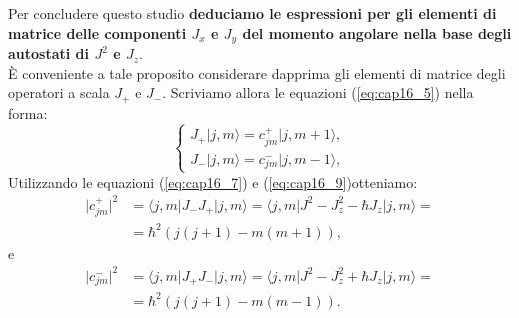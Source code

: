 Per concludere questo studio \textbf{deduciamo le espressioni per gli elementi di matrice delle componenti $J_x$ e $J_y$ del momento angolare nella base degli autostati di $J^2$ e $J_z$}.\\

È conveniente a tale proposito considerare dapprima gli elementi di matrice degli operatori a scala $J_+$ e $J_-$. Scriviamo allora le equazioni (\ref{eq:cap16_5}) nella forma:
	\begin{equation}
		\begin{cases}
			J_+\vert j, m \rangle = c_{jm} ^+\vert j, m+1 \rangle , \\
			J_-\vert j, m \rangle = c_{jm} ^-\vert j, m-1 \rangle ,
		\end{cases}
	\end{equation}
Utilizzando le equazioni (\ref{eq:cap16_7}) e (\ref{eq:cap16_9})otteniamo:
	\begin{align}
		\vert c_{jm} ^+\vert ^2 &= \langle j, m \vert J_- J_+\vert j, m \rangle = \langle j, m \vert J^2- J_z ^2 -\hbar J_z\vert j, m \rangle =\nonumber \\
		&= \hbar ^2 \left( j(j+1) - m (m+1)\right) ,
	\end{align}
e
	\begin{align}
		\vert c_{jm} ^-\vert ^2 &= \langle j, m \vert J_+ J_-\vert j, m \rangle = \langle j, m \vert J^2- J_z ^2 +\hbar J_z\vert j, m \rangle =\nonumber \\
		&= \hbar ^2 \left( j(j+1) - m (m-1)\right) .
	\end{align}\\
	
